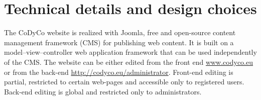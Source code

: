 \documentclass[12pt,a4paper,twoside]{article}
\begin{document}
\section{Technical details and design choices} \label{sec:tech}

The CoDyCo website is realized with Joomla,  free and open-source content management framework (CMS) for publishing web content. It is built on a model–view–controller web application framework that can be used independently of the CMS. The website can be either edited from the front end \url{www.codyco.eu} or from the back-end \url{http://codyco.eu/administrator}. Front-end editing is partial, restricted to certain web-pages and accessible only to registered users. Back-end editing is global and restricted only to administrators. 

\end{document}
